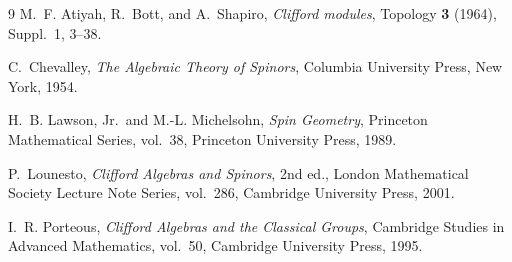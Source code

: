 \documentclass[11pt]{article}
\theoremstyle{definition}
\theoremstyle{remark}
\begin{document}
\clearpage
\begin{thebibliography}{9}
M.~F. Atiyah, R.~Bott, and A.~Shapiro, \emph{Clifford modules}, Topology \textbf{3} (1964), Suppl.~1, 3--38.

C.~Chevalley, \emph{The Algebraic Theory of Spinors}, Columbia University Press, New York, 1954.

H.~B. Lawson, Jr.\ and M.-L. Michelsohn, \emph{Spin Geometry}, Princeton Mathematical Series, vol.~38, Princeton University Press, 1989.

P.~Lounesto, \emph{Clifford Algebras and Spinors}, 2nd ed., London Mathematical Society Lecture Note Series, vol.~286, Cambridge University Press, 2001.

I.~R. Porteous, \emph{Clifford Algebras and the Classical Groups}, Cambridge Studies in Advanced Mathematics, vol.~50, Cambridge University Press, 1995.
\end{thebibliography}
\end{document}
